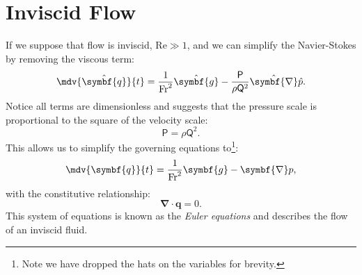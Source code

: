 \documentclass{article}
\theoremstyle{definition}
\begin{document}
\section{Inviscid Flow}
If we suppose that flow is inviscid, \(\mathrm{Re} \gg 1\), and we can
simplify the Navier-Stokes by removing the viscous term:
\begin{equation*}
    \mdv{\hat{\symbf{q}}}{t} = \frac{1}{\mathrm{Fr}^2} \hat{\symbf{g}} - \frac{\mathsf{P}}{\rho \mathsf{Q}^2} \hat{\symbf{\nabla}} \hat{p}.
\end{equation*}
Notice all terms are dimensionless and suggests that the pressure scale
is proportional to the square of the velocity scale:
\begin{equation*}
    \mathsf{P} = \rho \mathsf{Q}^2.
\end{equation*}
This allows us to simplify the governing equations to\footnote{Note we have
    dropped the hats on the variables for brevity.}:
\begin{equation*}
    \mdv{\symbf{q}}{t} = \frac{1}{\mathrm{Fr}^2} \symbf{g} - \symbf{\nabla} p,
\end{equation*}
with the constitutive relationship:
\begin{equation*}
    \symbf{\nabla} \cdot \symbf{q} = 0.
\end{equation*}
This system of equations is known as the \textit{Euler equations} and
describes the flow of an inviscid fluid.
\end{document}
